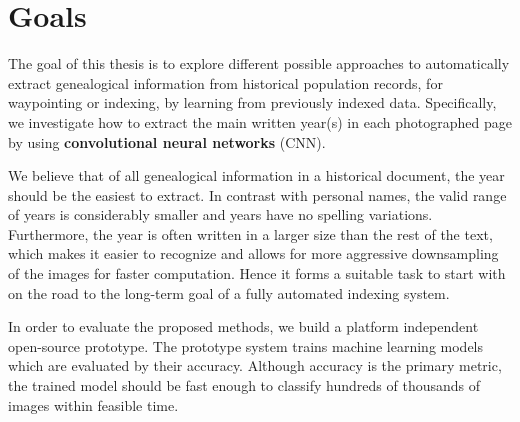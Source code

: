 \section{Goals}

The goal of this thesis is to explore different possible approaches to automatically extract genealogical information from historical population records, for waypointing or indexing, by learning from previously indexed data. Specifically, we investigate how to extract the main written year(s) in each photographed page by using \textbf{convolutional neural networks} (CNN).

We believe that of all genealogical information in a historical document, the year should be the easiest to extract.
In contrast with personal names, the valid range of years is considerably smaller and years have no spelling variations. Furthermore, the year is often written in a larger size than the rest of the text, which makes it easier to recognize and allows for more aggressive downsampling of the images for faster computation.
Hence it forms a suitable task to start with on the road to the long-term goal of a fully automated indexing system.


In order to evaluate the proposed methods, we build a platform independent open-source prototype. The prototype system trains machine learning models which are evaluated by their accuracy.
Although accuracy is the primary metric, the trained model should be fast enough to classify hundreds of thousands of images within feasible time.


